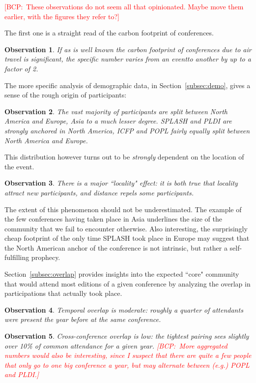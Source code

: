 \documentclass[manuscript, review, screen]{acmart}
\newcommand{\bcp}[1]{\textcolor{red}{{[BCP:~#1]}}}
\newcommand{\bcp}[1]{}
\newcommand{\event}{event} %
\newtheorem{obs}{Observation}
\begin{document}
\bcp{These observations do not seem all that opinionated.  Maybe move them
  earlier, with the figures they refer to?}

The first one is a straight read of the carbon footprint of conferences. 
\begin{obs}
If as is well known the carbon footprint of
conferences due to air travel is significant, the specific number
varies from an \event to another by up to a factor of 2.
\label{obs:footprint}
\end{obs}

The more specific analysis of demographic data, in Section~\ref{subsec:demo},
gives a sense of the rough origin of participants:

\begin{obs}
  The vast majority of participants are split between North America and Europe,
  Asia to a much lesser degree. SPLASH and PLDI are strongly anchored in North
  America, ICFP and POPL fairly equally split between North America and Europe.
  \label{obs:dist-naive}
\end{obs}

This distribution however turns out to be \emph{strongly} dependent on the
location of the \event.

\begin{obs}
  There is a major ``locality" effect: it is both true that locality attract
  new participants, and distance repels some participants.
  \label{obs:locality}
\end{obs}

The extent of this phenomenon should not be underestimated. The example of the
few conferences having taken place in Asia underlines the size of the community
that we fail to encounter otherwise. Also interesting, the surprisingly cheap
footprint of the only time SPLASH took place in Europe may suggest that the
North American anchor of the conference is not intrinsic, but rather a
self-fulfilling prophecy.

Section~\ref{subsec:overlap} provides insights into the expected ``core" community
that would attend most editions of a given conference by analyzing the overlap
in participations that actually took place.

\begin{obs}
  Temporal overlap is moderate: roughly a quarter of attendants were present
  the year before at the same conference.
  \label{obs:overlap-temp}
\end{obs}

\begin{obs}
  Cross-conference overlap is low: the tightest pairing sees slightly over 10\%
  of common attendance for a given year.  \bcp{More aggregated numbers would
  also be interesting, since I suspect that there are quite a few people
  that only go to one big conference a year, but may alternate between
  (e.g.) POPL and PLDI.}
  \label{obs:overlap-cross}
\end{obs}
\end{document}
